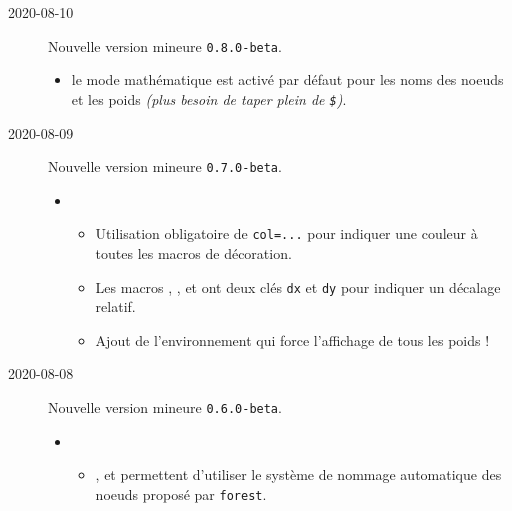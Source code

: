 \documentclass[12pt,a4paper]{article}
\begin{document}
\begin{description}
    \medskip
    \item[2020-08-10] Nouvelle version mineure \verb+0.8.0-beta+.
    
    \begin{itemize}[itemsep=.5em]
        \item {}
              le mode mathématique est activé par défaut pour les noms des noeuds et les poids \emph{(plus besoin de taper plein de \texttt{\$})}.
    \end{itemize}
    
    
    \separation

    \medskip
    \item[2020-08-09] Nouvelle version mineure \verb+0.7.0-beta+.
    
    \begin{itemize}[itemsep=.5em]
        \item {}
        \begin{itemize}[itemsep=.5em]
            \item Utilisation obligatoire de \verb#col=...# pour indiquer une couleur à toutes les macros de décoration.
            
            \item Les macros , , 
                   et 
                  ont deux clés \verb#dx# et \verb#dy# pour indiquer un décalage relatif.
            
            \item Ajout de l'environnement  qui force l'affichage de tous les poids !
        \end{itemize}
    \end{itemize}
    
    
    \separation

    \medskip
    \item[2020-08-08] Nouvelle version mineure \verb+0.6.0-beta+.
    
    \begin{itemize}[itemsep=.5em]
        \item {}
        \begin{itemize}[itemsep=.5em]
            \item {},  et  permettent d'utiliser le système de nommage automatique des noeuds proposé par \verb#forest#.
            

\end{itemize}
\end{itemize}
\end{description}
\end{document}
